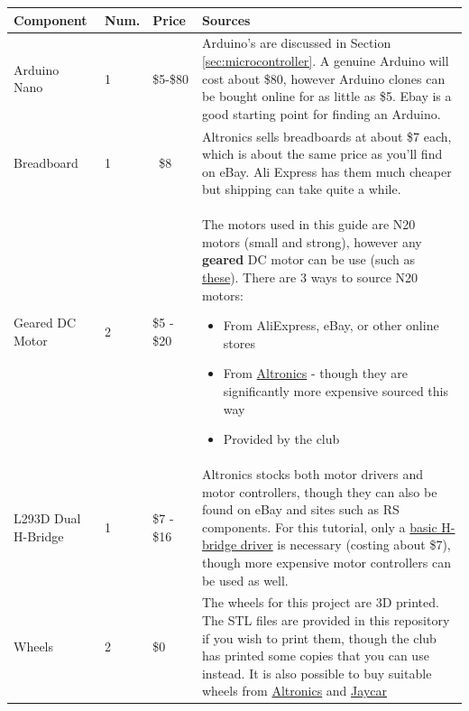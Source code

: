 \documentclass[a4paper,12pt]{article}
\begin{document}
    \begin{xltabular}{\linewidth}{p{0.15\textwidth} p{0.05\textwidth} p{0.1\textwidth} X}
        \toprule
        Component & Num. & Price & Sources \\ \midrule
        Arduino Nano & 1 & \$5-\$80 & Arduino's are discussed in Section \ref{sec:microcontroller}. A genuine Arduino will cost about \$80, however Arduino clones can be bought online for as little as \$5. Ebay is a good starting point for finding an Arduino.  \\
        Breadboard & 1 & ~\$8& Altronics sells breadboards at about \$7 each, which is about the same price as you'll find on eBay. Ali Express has them much cheaper but shipping can take quite a while. \\[2cm]
        Geared DC Motor & 2 & \$5 - \$20 & The motors used in this guide are N20 motors (small and strong), however any \textbf{geared} DC motor can be use (such as \href{https://www.jaycar.com.au/dc-geared-motor-with-rubber-wheel/p/YG2900}{these}). There are 3 ways to source N20 motors: \begin{itemize}
            \item From AliExpress, eBay, or other online stores
            \item From \href{https://www.altronics.com.au/p/j0054-micro-m20-geared-motor-150:1-50-200rpm/}{Altronics} - though they are significantly more expensive sourced this way
            \item Provided by the club
        \end{itemize} 
        \\
        L293D Dual H-Bridge & 1 & \$7 - \$16&   Altronics stocks both motor drivers and motor controllers, though they can also be found on eBay and sites such as RS components. For this tutorial, only a \href{https://www.altronics.com.au/p/z2900-l293d-motor-drive-ic/}{basic H-bridge driver} is necessary (costing about \$7), though more expensive motor controllers can be used as well. \\[3cm]
        
        Wheels & 2& \$0 & The wheels for this project are 3D printed. The STL files are provided in this repository if you wish to print them, though the club has printed some copies that you can use instead.  It is also possible to buy suitable wheels from \href{https://www.altronics.com.au/p/j0102-white-plastic-wheel-for-micro-n20-motors/}{Altronics} and \href{https://www.jaycar.com.au/duinotech-micro-wheels-tyres-sold-as-a-pair/p/YG2902}{Jaycar} \\[3cm]


\end{xltabular}
\end{document}
